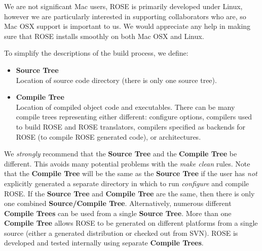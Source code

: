    We are not significant Mac users, ROSE is primarily developed under Linux, 
however we are particularly interested in supporting collaborators who are, 
so Mac OSX support is important to us.  We would appreciate any help in making 
sure that ROSE installs smoothly on both Mac OSX and Linux.



To simplify the descriptions of the build process, we define:
\begin{itemize} 
   \item {\bf Source Tree} \\
         Location of source code directory (there is only one source tree).
   \item {\bf Compile Tree} \\
         Location of compiled object code and executables. There can be many compile trees
         representing either different: configure options, compilers used to build ROSE
         and ROSE translators, compilers specified as backends for ROSE (to compile ROSE
         generated code), or architectures.
\end{itemize}

We {\em strongly} recommend that the {\bf Source Tree} and the {\bf Compile Tree} be
different. This avoids many potential problems with the {\em make clean} rules.
Note that the {\bf Compile Tree} will be the same as the {\bf Source Tree}
if the user has {\em not} explicitly generated a separate directory in which to
run {\em configure} and compile ROSE. If the {\bf Source Tree} and {\bf Compile Tree} 
are the same, then there is only one combined {\bf Source/Compile Tree}.
Alternatively, numerous different {\bf Compile Trees} can be used from 
a single {\bf Source Tree}.  More than one {\bf Compile Tree} allows
ROSE to be generated on different platforms from a single source 
(either a generated distribution or checked out from SVN).  ROSE is developed 
and tested internally using separate {\bf Compile Trees}. \\


